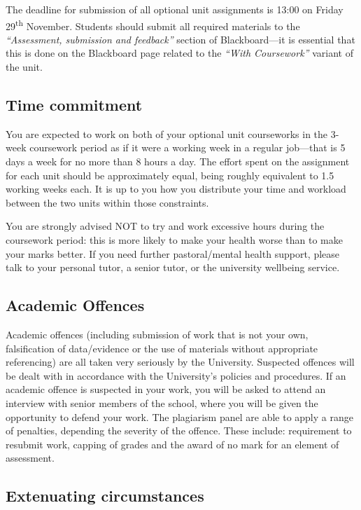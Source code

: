 \documentclass{article}
\newcommand\duedate[0]{Friday 29\textsuperscript{th} November}
\begin{document}
The deadline for submission of all optional unit assignments is 13:00 on
\duedate{}. Students should submit all
required materials to the \emph{``Assessment, submission and feedback''}
section of Blackboard---it is essential that this is done on the
Blackboard page related to the \emph{``With Coursework''} variant of the unit.

\subsection*{Time commitment}

You are expected to work on both of your optional unit courseworks in
the 3-week coursework period as if it were a working week in a regular
job---that is 5 days a week for no more than 8 hours a day. The effort
spent on the assignment for each unit should be approximately equal,
being roughly equivalent to 1.5 working weeks each. It is up to you how
you distribute your time and workload between the two units within those
constraints.

You are strongly advised NOT to try and work excessive hours during the
coursework period: this is more likely to make your health worse than to
make your marks better. If you need further pastoral/mental health
support, please talk to your personal tutor, a senior tutor, or the
university wellbeing service.

\subsection*{Academic Offences}

Academic offences (including submission of work that is not your own,
falsification of data/evidence or the use of materials without
appropriate referencing) are all taken very seriously by the University.
Suspected offences will be dealt with in accordance with the
University's policies and procedures. If an academic offence is
suspected in your work, you will be asked to attend an interview with
senior members of the school, where you will be given the opportunity to
defend your work. The plagiarism panel are able to apply a range of
penalties, depending the severity of the offence. These include:
requirement to resubmit work, capping of grades and the award of no mark
for an element of assessment.

\subsection*{Extenuating circumstances}
\end{document}
